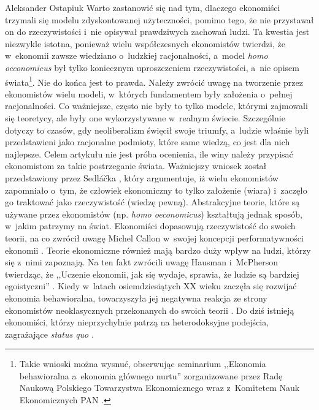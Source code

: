 \begin{artplenv}{Aleksander Ostapiuk}
Warto zastanowić się nad tym, dlaczego ekonomiści trzymali się modelu zdyskontowanej użyteczności, pomimo tego, że nie
przystawał on do rzeczywistości i~nie opisywał prawdziwych zachowań ludzi. Ta kwestia jest niezwykle istotna, ponieważ
wielu współczesnych ekonomistów twierdzi, że w~ekonomii zawsze wiedziano o~ludzkiej racjonalności,
a~model \textit{homo oeconomicus} był tylko koniecznym uproszczeniem rzeczywistości, a~nie opisem
świata\footnote{Takie wnioski można wysnuć, obserwując seminarium ,,Ekonomia behawioralna a~ekonomia głównego nurtu''
zorganizowane przez Radę Naukową Polskiego Towarzystwa Ekonomicznego wraz z~Komitetem Nauk Ekonomicznych PAN
\parencite[zob.][]{noauthor_stenogram_2018}.
}. Nie do końca jest to prawda. Należy zwrócić uwagę na tworzenie przez ekonomistów wielu modeli,
w~których fundamentem były założenia o~pełnej racjonalności. Co ważniejsze, często nie były to tylko modele, którymi
zajmowali się teoretycy, ale były one wykorzystywane w~realnym świecie. Szczególnie dotyczy to czasów, gdy
neoliberalizm święcił swoje triumfy, a~ludzie właśnie byli przedstawieni jako racjonalne podmioty, które same wiedzą, co
jest dla nich najlepsze. Celem artykułu nie jest próba ocenienia, ile winy należy przypisać ekonomistom za takie
postrzeganie świata. Ważniejszy wniosek został przedstawiony przez Sedláčka
\parencite*{sedlacek_ekonomia_2012_ost},
który
argumentuje, iż wielu ekonomistów zapomniało o~tym, że człowiek ekonomiczny to tylko założenie (wiara) i~zaczęło go
traktować jako rzeczywistość (wiedzę pewną). Abstrakcyjne teorie, które są używane przez ekonomistów (np. \textit{homo
oeconomicus}) kształtują jednak sposób, w~jakim patrzymy na świat. Ekonomiści dopasowują rzeczywistość do swoich teorii,
na co zwrócił uwagę Michel Callon w~swojej koncepcji performatywności ekonomii
\parencites{callon_what_2006}[więcej zob.][]{boldyrev_enacting_2016}.
Teorie ekonomiczne również mają bardzo duży wpływ na ludzi, którzy się z~nimi
zapoznają. Na ten fakt zwrócili uwagę Hausman i~McPherson twierdząc, że ,,Uczenie ekonomii, jak się wydaje, sprawia, że
ludzie są bardziej egoistyczni''
\parencite[s.~674]{hausman_taking_1993}.
Kiedy w~latach osiemdziesiątych XX wieku zaczęła się rozwijać ekonomia
behawioralna, towarzyszyła jej negatywna reakcja ze strony ekonomistów neoklasycznych przekonanych do swoich teorii
\parencite[zob.][]{thaler_misbehaving:_2015}.
Do dziś istnieją ekonomiści, którzy nieprzychylnie patrzą na heterodoksyjne podejścia, zagrażające
\textit{status quo}
\parencite[zob.][]{fourcade_superiority_2015,colander_how_2018}.


\end{artplenv}
